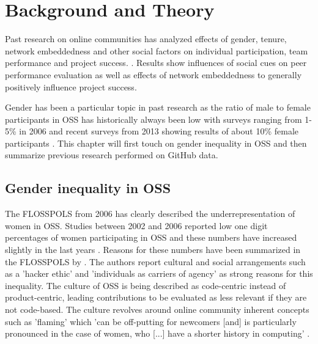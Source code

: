 \section{Background and Theory}

Past research on online communities has analyzed effects of gender, tenure, network embeddedness and other social factors on individual participation, team performance and project success. \cite{Vasilescu:2015:GTD:2702123.2702549,vasilescu:2012:6542459,doi:10.1287/mnsc.1060.0550}. Results show influences of social cues on peer performance evaluation as well as effects of network embeddedness to generally positively influence project success.


Gender has been a particular topic in past research as the ratio of male to female participants in \ac{OSS} has historically always been low with surveys ranging from 1-5\% in 2006 and recent surveys from 2013 showing results of about 10\% female participants \cite{Vasilescu:2015:GTD:2702123.2702549,flosspols-gender:2005}. This chapter will first touch on gender inequality in \ac{OSS} and then summarize previous research performed on GitHub data.


\subsection{Gender inequality in OSS}

The \ac{FLOSSPOLS} from 2006 has clearly described the underrepresentation of women in \ac{OSS}. Studies between 2002 and 2006 reported low one digit percentages of women participating in \ac{OSS} and these numbers have increased slightly in the last years \cite{Vasilescu:2015:GTD:2702123.2702549}. Reasons for these numbers have been summarized in the \ac{FLOSSPOLS} by \citeauthor{flosspols-gender:2005}.
The authors report cultural and social arrangements such as a 'hacker ethic' and 'individuals as carriers of agency' as strong reasons for this inequality. The culture of \ac{OSS} is being described as code-centric instead of product-centric, leading contributions to be evaluated as less relevant if they are not code-based. The culture revolves around online community inherent concepts such as 'flaming' which 'can be off-putting for newcomers [and] is particularly pronounced in the case of women, who [...] have a shorter history in computing' \cite[p.6]{flosspols-gender:2005}.




